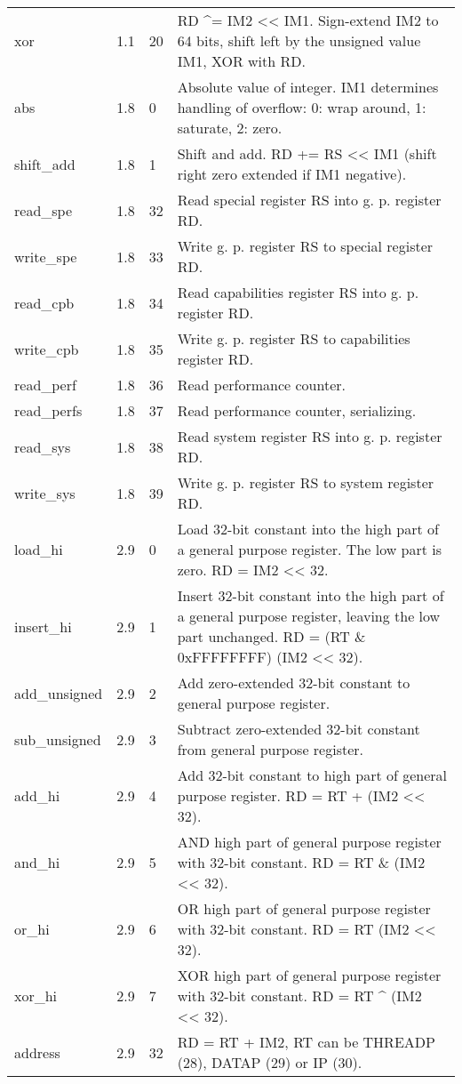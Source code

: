 \documentclass[forwardcom.tex]{subfiles}
\begin{document}
\begin{longtable} {|p{20mm}|p{10mm}|p{8mm}|p{75mm}|}
xor           & 1.1   & 20  & RD \^{}= IM2 \textless\textless{} IM1. Sign-extend IM2 to 64 bits, shift left by the unsigned value IM1, XOR with RD. \\
abs           & 1.8   &  0  & Absolute value of integer. IM1 determines handling of overflow: 0: wrap around, 1: saturate, 2: zero. \\
shift\_add    & 1.8   &  1  & Shift and add. RD += RS \textless\textless{} IM1 (shift right zero extended if IM1 negative). \\
read\_spe     & 1.8   & 32  & Read special register RS into g. p. register RD. \\
write\_spe    & 1.8   & 33  & Write g. p. register RS to special register RD. \\
read\_cpb     & 1.8   & 34  & Read capabilities register RS into g. p. register RD. \\
write\_cpb    & 1.8   & 35  & Write g. p. register RS to capabilities register RD. \\
read\_perf    & 1.8   & 36  & Read performance counter. \\
read\_perfs   & 1.8   & 37  & Read performance counter, serializing. \\
read\_sys     & 1.8   & 38  & Read system register RS into g. p. register RD. \\
write\_sys    & 1.8   & 39  & Write g. p. register RS to system register RD. \\

load\_hi      & 2.9   &  0  & Load 32-bit constant into the high part of a general purpose register. The low part is zero. RD = IM2 \textless\textless{} 32. \\
insert\_hi    & 2.9   &  1  & Insert 32-bit constant into the high part of a general purpose register, leaving the low part unchanged.
RD = (RT \& 0xFFFFFFFF) \textbar{} (IM2 \textless\textless{} 32). \\
add\_unsigned & 2.9   &  2  & Add zero-extended 32-bit constant to general purpose register. \\
sub\_unsigned & 2.9   &  3  & Subtract zero-extended 32-bit constant from general purpose register. \\
add\_hi       & 2.9   &  4  & Add 32-bit constant to high part of general purpose register. RD = RT + (IM2 \textless\textless{} 32). \\
and\_hi       & 2.9   &  5  & AND high part of general purpose register with 32-bit constant. RD = RT \& (IM2 \textless\textless{} 32). \\
or\_hi        & 2.9   &  6  & OR high part of general purpose register with 32-bit constant. RD = RT \textbar{} (IM2 \textless\textless{} 32). \\
xor\_hi       & 2.9   &  7  & XOR high part of general purpose register with 32-bit constant. RD = RT \^{} (IM2 \textless\textless{} 32). \\
address       & 2.9   & 32  & RD = RT + IM2, RT can be THREADP (28), DATAP (29) or IP (30). \\
\hline
\end{longtable}
\end{document}

